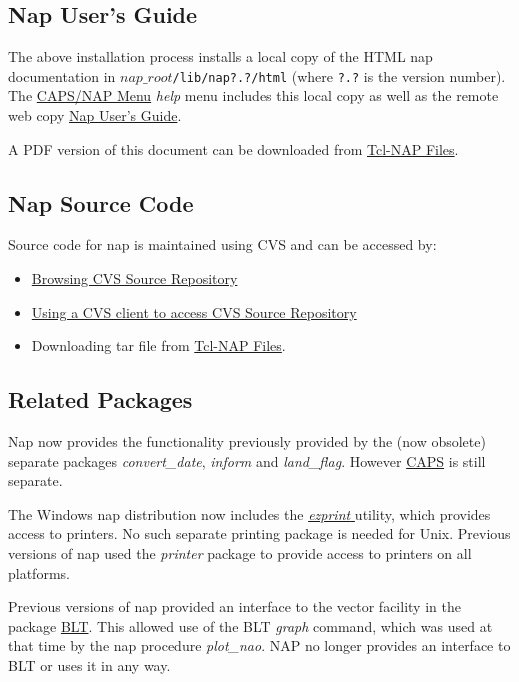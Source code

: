   \subsection{
    \label{nap:doc}Nap User's Guide
  }
The above installation process installs a local copy of the HTML
  nap documentation in 
  $nap\_root$\texttt{/lib/nap?.?/html} (where 
  \texttt{?.?} is the version number). The 
  \href{caps-nap-menu.html}{CAPS/NAP Menu} 
  \emph{help} menu includes this local copy as well as the remote web
  copy 
  \href{http://tcl-nap.sourceforge.net/contents.html}{Nap User's Guide}.
  \par A PDF version of this document can be downloaded from 
  \href{http://sourceforge.net/project/showfiles.php?group-id=55616}{ Tcl-NAP Files}.
  \subsection{
    \label{source}Nap Source Code
  }
Source code for nap is maintained using CVS and can be accessed
  by:
  \begin{itemize}
    \item 
      \href{http://cvs.sourceforge.net/cgi-bin/viewcvs.cgi/tcl-nap/}{ Browsing CVS Source Repository}
    \item 
      \href{http://sourceforge.net/cvs/?group-id=55616}{Using a CVS client to access CVS Source Repository}
    \item Downloading tar file from 
    \href{http://sourceforge.net/project/showfiles.php?group-id=55616}{ Tcl-NAP Files}.
  \end{itemize}
  \subsection{
    \label{Related:Packages}Related Packages
  }
Nap now provides the functionality previously provided by the
  (now obsolete) separate packages 
  \emph{convert\_date}, 
  \emph{inform} and 
  \emph{land\_flag}. However 
  \href{http://www.dar.csiro.au/rs/Capshome.html}{CAPS} is still
  separate.
  \par The Windows nap distribution now includes the 
  \href{http://lbayuk.home.mindspring.com/ezprint/}{ \emph{ezprint} }
	utility, which provides access to printers. No such separate
  printing package is needed for Unix. Previous versions of nap used
  the 
  \emph{printer} package to provide access to printers on all
  platforms.
  \par Previous versions of nap provided an interface to the vector
  facility in the package 
  \href{http://sourceforge.net/projects/blt/}{BLT}. This allowed
  use of the BLT 
  \emph{graph} command, which was used at that time by the nap
  procedure 
  \emph{plot\_nao}. NAP no longer provides an interface to BLT or uses
  it in any way.
